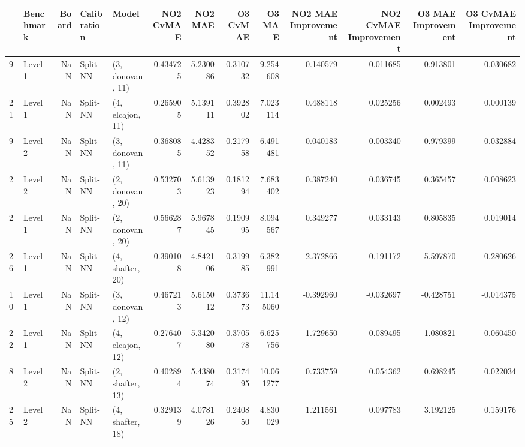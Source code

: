\begin{tabular}{llrllrrrrrrrr}
\toprule
{} & Benchmark &  Board &    Calibration &             Model &  NO2 CvMAE &    NO2 MAE &  O3 CvMAE &     O3 MAE &  NO2 MAE Improvement &  NO2 CvMAE Improvement &  O3 MAE Improvement &  O3 CvMAE Improvement \\
\midrule
9  &   Level 1 &    NaN &       Split-NN &  (3, donovan, 11) &   0.434725 &   5.230086 &  0.310732 &   9.254608 &            -0.140579 &              -0.011685 &           -0.913801 &             -0.030682 \\
21 &   Level 1 &    NaN &       Split-NN &  (4, elcajon, 11) &   0.265905 &   5.139111 &  0.392802 &   7.023114 &             0.488118 &               0.025256 &            0.002493 &              0.000139 \\
9  &   Level 2 &    NaN &       Split-NN &  (3, donovan, 11) &   0.368085 &   4.428352 &  0.217958 &   6.491481 &             0.040183 &               0.003340 &            0.979399 &              0.032884 \\
2  &   Level 2 &    NaN &       Split-NN &  (2, donovan, 20) &   0.532703 &   5.613923 &  0.181294 &   7.683402 &             0.387240 &               0.036745 &            0.365457 &              0.008623 \\
2  &   Level 1 &    NaN &       Split-NN &  (2, donovan, 20) &   0.566287 &   5.967845 &  0.190995 &   8.094567 &             0.349277 &               0.033143 &            0.805835 &              0.019014 \\
26 &   Level 1 &    NaN &       Split-NN &  (4, shafter, 20) &   0.390108 &   4.842106 &  0.319985 &   6.382991 &             2.372866 &               0.191172 &            5.597870 &              0.280626 \\
10 &   Level 1 &    NaN &       Split-NN &  (3, donovan, 12) &   0.467213 &   5.615012 &  0.373673 &  11.145060 &            -0.392960 &              -0.032697 &           -0.428751 &             -0.014375 \\
22 &   Level 1 &    NaN &       Split-NN &  (4, elcajon, 12) &   0.276407 &   5.342080 &  0.370578 &   6.625756 &             1.729650 &               0.089495 &            1.080821 &              0.060450 \\
8  &   Level 2 &    NaN &       Split-NN &  (2, shafter, 13) &   0.402894 &   5.438074 &  0.317495 &  10.061277 &             0.733759 &               0.054362 &            0.698245 &              0.022034 \\
25 &   Level 2 &    NaN &       Split-NN &  (4, shafter, 18) &   0.329139 &   4.078126 &  0.240850 &   4.830029 &             1.211561 &               0.097783 &            3.192125 &              0.159176 \\

\end{tabular}
